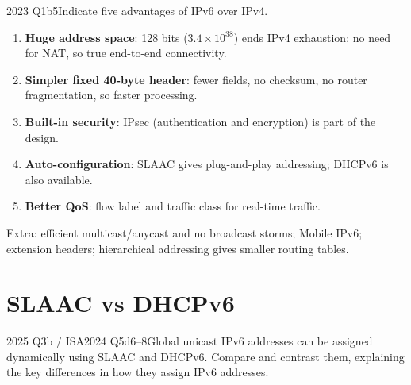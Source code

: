 \documentclass[10pt]{article}
\begin{document}
\begin{pastq}{2023 Q1b}{5}Indicate five advantages of IPv6 over IPv4.\end{pastq}
\begin{ans}
\begin{enumerate}
\item \textbf{Huge address space}: 128 bits ($3.4\times10^{38}$) ends IPv4 exhaustion; no need for NAT, so true end-to-end connectivity.
\item \textbf{Simpler fixed 40-byte header}: fewer fields, no checksum, no router fragmentation, so faster processing.
\item \textbf{Built-in security}: IPsec (authentication and encryption) is part of the design.
\item \textbf{Auto-configuration}: SLAAC gives plug-and-play addressing; DHCPv6 is also available.
\item \textbf{Better QoS}: flow label and traffic class for real-time traffic.
\end{enumerate}
Extra: efficient multicast/anycast and no broadcast storms; Mobile IPv6; extension headers; hierarchical addressing gives smaller routing tables.
\end{ans}

\section{SLAAC vs DHCPv6}

\begin{pastq}{2025 Q3b \textnormal{/} ISA2024 Q5d}{6--8}Global unicast IPv6 addresses can be assigned dynamically using SLAAC and DHCPv6. Compare and contrast them, explaining the key differences in how they assign IPv6 addresses.\end{pastq}
\end{document}
